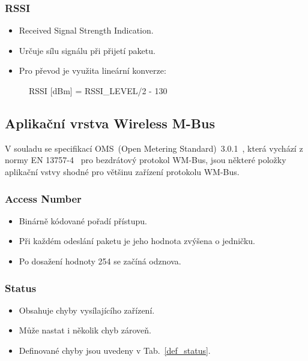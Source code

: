 \subsubsection{RSSI}
\begin{itemize}
	\item Received Signal Strength Indication.
	\item Určuje sílu signálu při přijetí paketu.
	\item Pro převod je využita lineární konverze:
\end{itemize}	
				\begin{figure}[!ht]
				\begin{centerverbatim}
				RSSI [dBm] = RSSI_LEVEL/2 - 130
				\end{centerverbatim}
			\end{figure}



\subsection{Aplikační vrstva Wireless M-Bus}

V souladu se specifikací OMS~(Open Metering Standard)~3.0.1~\cite{NormaOMS}, která vychází z normy EN 13757-4~\cite{Norma4} pro bezdrátový protokol WM-Bus, jsou některé položky aplikační vstvy shodné pro většinu zařízení protokolu WM-Bus.


\subsubsection{Access Number}
\begin{itemize}
	\item Binárně kódované pořadí přístupu.
	\item Při každém odeslání paketu je jeho hodnota zvýšena o jedničku.
	\item Po dosažení hodnoty 254 se začíná odznova.
\end{itemize}

\subsubsection{Status}
\begin{itemize}
	\item Obsahuje chyby vysílajícího zařízení.
	\item Může nastat i několik chyb zároveň.
	\item Definované chyby jsou uvedeny v Tab.~\ref{def_status}.
\end{itemize}


